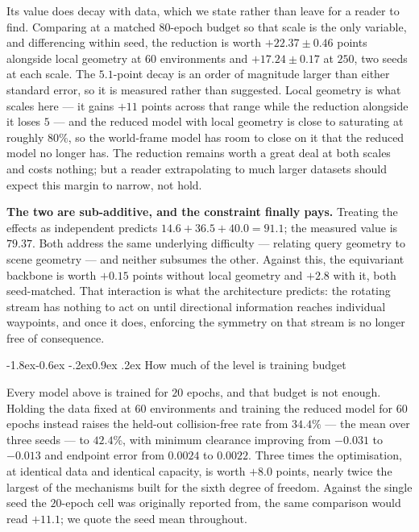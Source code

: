 \documentclass[10pt,twocolumn,letterpaper]{article}
\makeatletter
\renewcommand\subsection{\@startsection{subsection}{2}{\z@}%
  {-1.8ex\@plus -0.6ex \@minus -.2ex}{0.9ex \@plus .2ex}%
  {\normalfont\normalsize\bfseries}}
\theoremstyle{plain}
\makeatother
\begin{document}
Its value does decay with data, which we state rather than leave for a reader to
find. Comparing at a matched $80$-epoch budget so that scale is the only
variable, and differencing within seed, the reduction is worth
$\mathbf{+22.37\pm0.46}$ points alongside local geometry at $60$ environments and
$\mathbf{+17.24\pm0.17}$ at $250$, two seeds at each scale. The $5.1$-point decay
is an order of magnitude larger than either standard error, so it is measured
rather than suggested. Local geometry is what scales here --- it gains $+11$
points across that range while the reduction alongside it loses $5$ --- and the
reduced model with local geometry is close to saturating at roughly $80\%$, so the
world-frame model has room to close on it that the reduced model no longer has. The
reduction remains worth a great deal at both scales and costs nothing; but a
reader extrapolating to much larger datasets should expect this margin to narrow,
not hold.

\textbf{The two are sub-additive, and the constraint finally pays.} Treating the
effects as independent predicts $14.6+36.5+40.0=91.1$; the measured value is
$79.37$. Both address the same underlying difficulty --- relating query geometry
to scene geometry --- and neither subsumes the other. Against this, the
equivariant backbone is worth $+0.15$ points without local geometry and $+2.8$
with it, both seed-matched. That interaction is what the architecture predicts: the rotating stream
has nothing to act on until directional information reaches individual
waypoints, and once it does, enforcing the symmetry on that stream is no longer
free of consequence.

\subsection{How much of the level is training budget}
\label{sec:budget}

Every model above is trained for $20$ epochs, and that budget is not enough. Holding
the data fixed at $60$ environments and training the reduced model for $60$ epochs
instead raises the held-out collision-free rate from $34.4\%$ --- the mean over
three seeds --- to $\mathbf{42.4\%}$, with minimum clearance improving from
$-0.031$ to $-0.013$ and endpoint error from $0.0024$ to $0.0022$. Three times
the optimisation, at identical data and identical capacity, is worth $+8.0$
points, nearly twice the largest of the mechanisms built for the sixth degree of
freedom. Against the single seed the $20$-epoch cell was originally reported
from, the same comparison would read $+11.1$; we quote the seed mean throughout.
\end{document}
